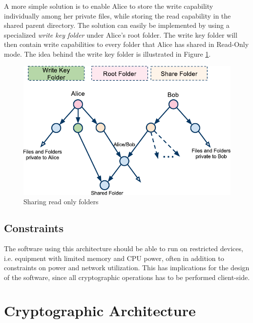 \documentclass[pdftex,english,10pt,b5paper,twoside]{book}
\begin{document}
A more simple solution is to enable Alice to store the write capability
individually among her private files, while storing the read capability in the
shared parent directory. The solution can easily be implemented by using a
specialized \emph{write key folder} under Alice's root folder. The write key
folder will then contain write capabilities to every folder that Alice has
shared in Read-Only mode. The idea behind the write key folder is illustrated
in Figure \ref{fig:AS:readonly}.

\begin{figure}[h!]
    \centering
    \includegraphics[width=\columnwidth]{ArchitectureShareReadOnlyFolder.pdf}
    \caption{Sharing read only folders}
    \label{fig:AS:readonly}
\end{figure}

\subsection{Constraints}

The software using this architecture should be able to run on restricted
devices, i.e. equipment with limited memory and \ac{CPU} power, often in
addition to constraints on power and network utilization. This has implications
for the design of the software, since all cryptographic operations has to be
performed client-side.

\section{Cryptographic Architecture}
\label{chap:CS}
\end{document}
